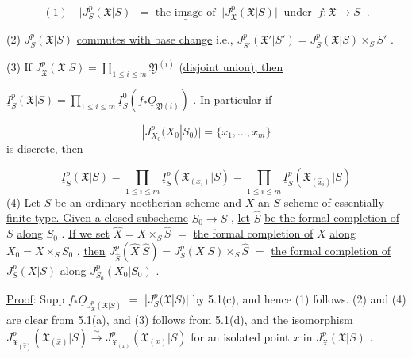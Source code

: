 \begin{equation*}
(1)\quad \big|J^{p}_{S}(\mathfrak{X}|S)\big| \;=\; \underline{\text{the image of}} \;\; \big|J^{p}_{\mathfrak{X}}(\mathfrak{X}|S)\big| \;\; \underline{\text{under}} \;\; f : \mathfrak{X} \to S \;\;.
\end{equation*}


(2)  $J^p_S(\mathfrak{X}|S)$  \underline{commutes with base change}  i.e.,  $J^p_{S'}(\mathfrak{X}'|S') = J^p_S(\mathfrak{X}|S) \times_S S'$  .

(3)  If  $J^p_{\mathfrak{X}}(\mathfrak{X}|S) = \coprod_{1\leq i\leq m} \mathfrak{Y}^{(i)}$  \underline{(disjoint union), then}

$\underline{I}^p_S(\mathfrak{X}|S) = \prod_{1\leq i\leq m} \underline{I}^0_S(f_*\underline{O}_{\mathfrak{Y}(i)})$  . \underline{In particular if}

\begin{equation*}
|J^p_{X_0}(X_0|S_0)| = \{x_1,\ldots,x_m\}
\end{equation*}
\underline{is discrete, then}

\begin{equation*}
\underline{I}^p_S(\mathfrak{X}|S) = \prod_{1\leq i\leq m} \underline{I}^p_S(\mathfrak{X}_{(x_i)}|S) = \prod_{1\leq i\leq m} \underline{I}^p_S(\mathfrak{X}_{(\hat{x}_i)}|S)
\end{equation*}
(4)  \underline{Let}  $S$  \underline{be an ordinary noetherian scheme and}  $X$  \underline{an} $S$-\underline{scheme of essentially finite type. Given a closed subscheme}  $S_0 \to S$  , \underline{let}  $\hat{S}$  \underline{be the formal completion of}  $S$  \underline{along}  $S_0$  . \underline{If we set}  $\hat{X} = X \times_S \hat{S}$ $=$ \underline{the formal completion of}  $X$  \underline{along}  $X_0 = X \times_S S_0$  , \underline{then}  $J^p_{\hat{S}}(\hat{X}|\hat{S}) = J^p_S(X|S) \times_S \hat{S}$ $=$ \underline{the formal completion of}  $J^p_S(X|S)$  \underline{along}  $J^p_{S_0}(X_0|S_0)$  .

\underline{Proof}:  Supp $f_*\underline{O}_{J^p_{\mathfrak{X}}(\mathfrak{X}|S)}$ $=$ $|J^p_S(\mathfrak{X}|S)|$  by 5.1(c), and hence (1) follows. (2) and (4) are clear from 5.1(a), and (3) follows from 5.1(d), and the isomorphism $J^p_{\mathfrak{X}_{(\hat{x})}}(\mathfrak{X}_{(\hat{x})}|S) \xrightarrow{\sim} J^p_{\mathfrak{X}_{(x)}}(\mathfrak{X}_{(x)}|S)$  for an isolated point  $x$  in  $J^p_{\mathfrak{X}}(\mathfrak{X}|S)$  .

